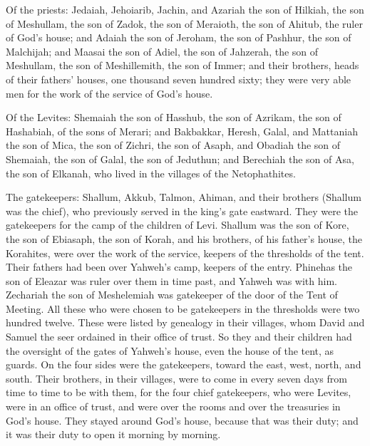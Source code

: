  Of the priests: Jedaiah, Jehoiarib, Jachin,
 and Azariah the son of Hilkiah, the son of Meshullam,
the son of Zadok, the son of Meraioth, the son of Ahitub, the ruler of
God's house;  and Adaiah the son of Jeroham, the son of
Pashhur, the son of Malchijah; and Maasai the son of Adiel, the son of
Jahzerah, the son of Meshullam, the son of Meshillemith, the son of
Immer;  and their brothers, heads of their fathers'
houses, one thousand seven hundred sixty; they were very able men for
the work of the service of God's house.

 Of the Levites: Shemaiah the son of Hasshub, the son of
Azrikam, the son of Hashabiah, of the sons of Merari; 
and Bakbakkar, Heresh, Galal, and Mattaniah the son of Mica, the son of
Zichri, the son of Asaph,  and Obadiah the son of
Shemaiah, the son of Galal, the son of Jeduthun; and Berechiah the son
of Asa, the son of Elkanah, who lived in the villages of the
Netophathites.

 The gatekeepers: Shallum, Akkub, Talmon, Ahiman, and
their brothers (Shallum was the chief),  who previously
served in the king's gate eastward. They were the gatekeepers for the
camp of the children of Levi.  Shallum was the son of
Kore, the son of Ebiasaph, the son of Korah, and his brothers, of his
father's house, the Korahites, were over the work of the service,
keepers of the thresholds of the tent. Their fathers had been over
Yahweh's camp, keepers of the entry.  Phinehas the son of
Eleazar was ruler over them in time past, and Yahweh was with him.
 Zechariah the son of Meshelemiah was gatekeeper of the
door of the Tent of Meeting.  All these who were chosen
to be gatekeepers in the thresholds were two hundred twelve. These were
listed by genealogy in their villages, whom David and Samuel the seer
ordained in their office of trust.  So they and their
children had the oversight of the gates of Yahweh's house, even the
house of the tent, as guards.  On the four sides were the
gatekeepers, toward the east, west, north, and south. 
Their brothers, in their villages, were to come in every seven days from
time to time to be with them,  for the four chief
gatekeepers, who were Levites, were in an office of trust, and were over
the rooms and over the treasuries in God's house.  They
stayed around God's house, because that was their duty; and it was their
duty to open it morning by morning.

